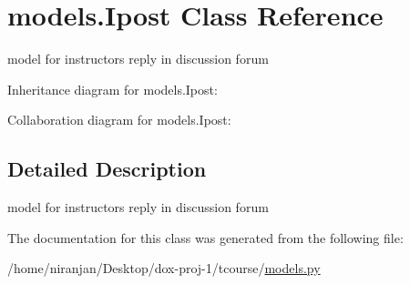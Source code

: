 \hypertarget{classmodels_1_1_ipost}{}\section{models.\+Ipost Class Reference}
\label{classmodels_1_1_ipost}


model for instructor\textquotesingle{}s reply in discussion forum  




Inheritance diagram for models.\+Ipost\+:


Collaboration diagram for models.\+Ipost\+:


\subsection{Detailed Description}
model for instructor\textquotesingle{}s reply in discussion forum 

The documentation for this class was generated from the following file\+:\begin{DoxyCompactItemize}
\item 
/home/niranjan/\+Desktop/dox-\/proj-\/1/tcourse/\hyperlink{models_8py}{models.\+py}\end{DoxyCompactItemize}
